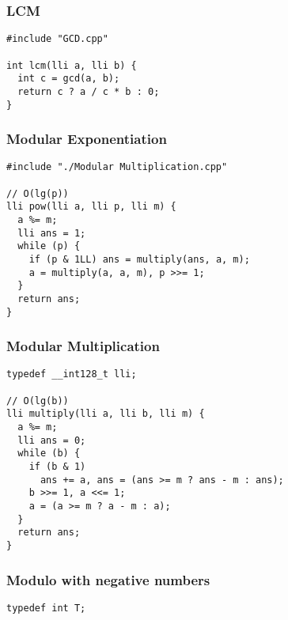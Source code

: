 \documentclass[twoside]{article}
\begin{document}
\begin{multicols*}{2}
\subsubsectionfont{\large\bfseries\sffamily\underline}
\subsubsection*{LCM}
\begin{verbatim}
#include "GCD.cpp"

int lcm(lli a, lli b) {
  int c = gcd(a, b);
  return c ? a / c * b : 0;
}
\end{verbatim}

\subsubsectionfont{\large\bfseries\sffamily\underline}
\subsubsection*{Modular Exponentiation}
\begin{verbatim}
#include "./Modular Multiplication.cpp"

// O(lg(p))
lli pow(lli a, lli p, lli m) {
  a %= m;
  lli ans = 1;
  while (p) {
    if (p & 1LL) ans = multiply(ans, a, m);
    a = multiply(a, a, m), p >>= 1;
  }
  return ans;
}
\end{verbatim}

\subsubsectionfont{\large\bfseries\sffamily\underline}
\subsubsection*{Modular Multiplication}
\begin{verbatim}
typedef __int128_t lli;

// O(lg(b))
lli multiply(lli a, lli b, lli m) {
  a %= m;
  lli ans = 0;
  while (b) {
    if (b & 1)
      ans += a, ans = (ans >= m ? ans - m : ans);
    b >>= 1, a <<= 1;
    a = (a >= m ? a - m : a);
  }
  return ans;
}
\end{verbatim}

\subsubsectionfont{\large\bfseries\sffamily\underline}
\subsubsection*{Modulo with negative numbers}
\begin{verbatim}
typedef int T;


\end{verbatim}
\end{multicols*}
\end{document}
